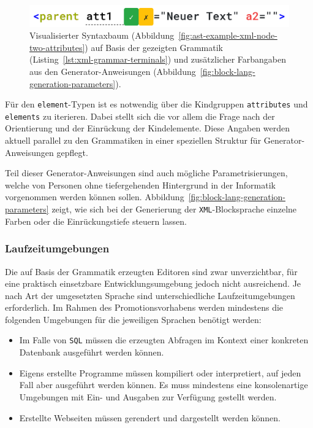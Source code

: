 \documentclass[paper=a4,fontsize=11pt,parskip=half]{scrartcl}
\begin{document}
\begin{figure}[p]
  \centering\includegraphics[width=\linewidth]{screenshot-generated-xml.png}
  \caption{Visualisierter Syntaxbaum (Abbildung~\ref{fig:ast-example-xml-node-two-attributes}) auf Basis der gezeigten Grammatik (Listing~\ref{lst:xml-grammar-terminals}) und zusätzlicher Farbangaben aus den Generator-Anweisungen (Abbildung~\ref{fig:block-lang-generation-parameters}).}
  \label{fig:example-xml-generated}
\end{figure}

Für den \texttt{element}-Typen ist es notwendig über die Kindgruppen \texttt{attributes} und \texttt{elements} zu iterieren. Dabei stellt sich die vor allem die Frage nach der Orientierung und der Einrückung der Kindelemente. Diese Angaben werden aktuell parallel zu den Grammatiken in einer speziellen Struktur für Generator-Anweisungen gepflegt.

Teil dieser Generator-Anweisungen sind auch mögliche Parametrisierungen, welche von Personen ohne tiefergehenden Hintergrund in der Informatik vorgenommen werden können sollen. Abbildung~\ref{fig:block-lang-generation-parameters} zeigt, wie sich bei der Generierung der \texttt{XML}-Blocksprache einzelne Farben oder die Einrückungstiefe steuern lassen.

\subsubsection{Laufzeitumgebungen}

Die auf Basis der Grammatik erzeugten Editoren sind zwar unverzichtbar, für eine praktisch einsetzbare Entwicklungsumgebung jedoch nicht ausreichend. Je nach Art der umgesetzten Sprache sind unterschiedliche Laufzeitumgebungen erforderlich. Im Rahmen des Promotionsvorhabens werden mindestens die folgenden Umgebungen für die jeweiligen Sprachen benötigt werden:

\begin{itemize}
\item Im Falle von \texttt{SQL} müssen die erzeugten Abfragen im Kontext einer konkreten Datenbank ausgeführt werden können.
\item Eigens erstellte Programme müssen kompiliert oder interpretiert, auf jeden Fall aber ausgeführt werden können. Es muss mindestens eine konsolenartige Umgebungen mit Ein- und Ausgaben zur Verfügung gestellt werden.
\item Erstellte Webseiten müssen gerendert und dargestellt werden können.
\end{itemize}
\end{document}
